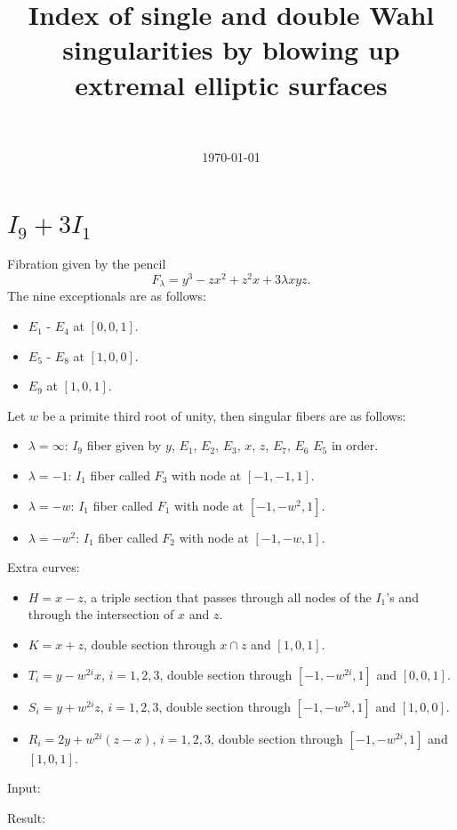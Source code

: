 \documentclass{article}
\title{Index of single and double Wahl singularities by blowing up extremal elliptic surfaces}
\author{\ }
\date{\today}
\begin{document}
\maketitle

\tableofcontents

\section{$I_9 + 3I_1$}
Fibration given by the pencil
\[F_{\lambda} = y^3 - zx^2 + z^2x + 3\lambda xyz.\]
The nine exceptionals are as follows:
\begin{itemize}
  \item $E_1$ - $E_4$ at $[0,0,1]$.
  \item $E_5$ - $E_8$ at $[1,0,0]$.
  \item $E_9$ at $[1,0,1]$.
\end{itemize}
Let $w$ be a primite third root of unity, then singular fibers are as follows:
\begin{itemize}
  \item $\lambda = \infty$: $I_9$ fiber given by $y$, $E_1$, $E_2$, $E_3$, $x$, $z$, $E_7$, $E_6$ $E_5$ in order.
  \item $\lambda = -1$: $I_1$ fiber called $F_3$ with node at $[-1,-1,1]$.
  \item $\lambda = -w$: $I_1$ fiber called $F_1$ with node at $[-1,-w^2,1]$.
  \item $\lambda = -w^2$: $I_1$ fiber called $F_2$ with node at $[-1,-w,1]$.
\end{itemize}
Extra curves:
\begin{itemize}
  \item $H = x-z$, a triple section that passes through all nodes of the $I_1$'s and through the intersection of $x$ and $z$.
  \item $K = x+z$, double section through $x \cap z$ and $[1,0,1]$.
  \item $T_i = y - w^{2i}x$, $i=1,2,3$, double section through $[-1,-w^{2i},1]$ and $[0,0,1]$.
  \item $S_i = y + w^{2i}z$, $i=1,2,3$, double section through $[-1,-w^{2i},1]$ and $[1,0,0]$.
  \item $R_i = 2y + w^{2i}(z-x)$, $i=1,2,3$, double section through $[-1,-w^{2i},1]$ and $[1,0,1]$.
\end{itemize}
Input:

%
Result:

\end{document}
